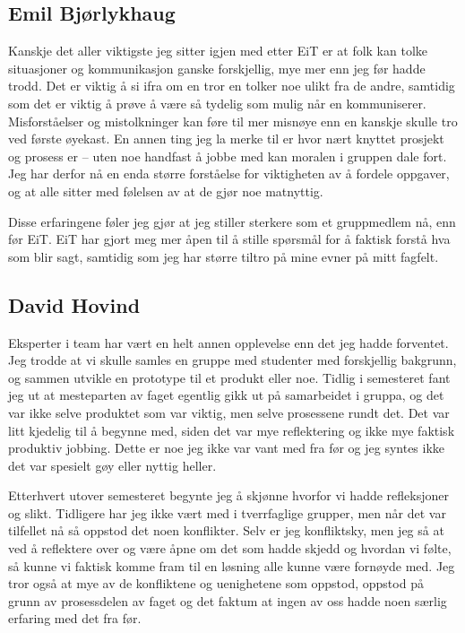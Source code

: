 \subsection*{Emil Bjørlykhaug}
Kanskje det aller viktigste jeg sitter igjen med etter EiT er at folk kan tolke situasjoner og kommunikasjon ganske forskjellig, mye mer enn jeg før hadde trodd. Det er viktig å si ifra om en tror en tolker noe ulikt fra de andre, samtidig som det er viktig å prøve å være så tydelig som mulig når en kommuniserer. Misforståelser og mistolkninger kan føre til mer misnøye enn en kanskje skulle tro ved første øyekast. En annen ting jeg la merke til er hvor nært knyttet prosjekt og prosess er – uten noe handfast å jobbe med kan moralen i gruppen dale fort. Jeg har derfor nå en enda større forståelse for viktigheten av å fordele oppgaver, og at alle sitter med følelsen av at de gjør noe matnyttig.

Disse erfaringene føler jeg gjør at jeg stiller sterkere som et gruppmedlem nå, enn før EiT. EiT har gjort meg mer åpen til å stille spørsmål for å faktisk forstå hva som blir sagt, samtidig som jeg har større tiltro på mine evner på mitt fagfelt. 

\subsection*{David Hovind}
Eksperter i team har vært en helt annen opplevelse enn det jeg hadde forventet. 
Jeg trodde at vi skulle samles en gruppe med studenter med forskjellig bakgrunn, og sammen utvikle en prototype til et produkt eller noe. 
Tidlig i semesteret fant jeg ut at mesteparten av faget egentlig gikk ut på samarbeidet i gruppa, og det var ikke selve produktet som var viktig, men selve prosessene rundt det. 
Det var litt kjedelig til å begynne med, siden det var mye reflektering og ikke mye faktisk produktiv jobbing. 
Dette er noe jeg ikke var vant med fra før og jeg syntes ikke det var spesielt gøy eller nyttig heller.

Etterhvert utover semesteret begynte jeg å skjønne hvorfor vi hadde refleksjoner og slikt. 
Tidligere har jeg ikke vært med i tverrfaglige grupper, men når det var tilfellet nå så oppstod det noen konflikter. 
Selv er jeg konfliktsky, men jeg så at ved å reflektere over og være åpne om det som hadde skjedd og hvordan vi følte, så kunne vi faktisk komme fram til en løsning alle kunne være fornøyde med. 
Jeg tror også at mye av de konfliktene og uenighetene som oppstod, oppstod på grunn av prosessdelen av faget og det faktum at ingen av oss hadde noen særlig erfaring med det fra før. 

